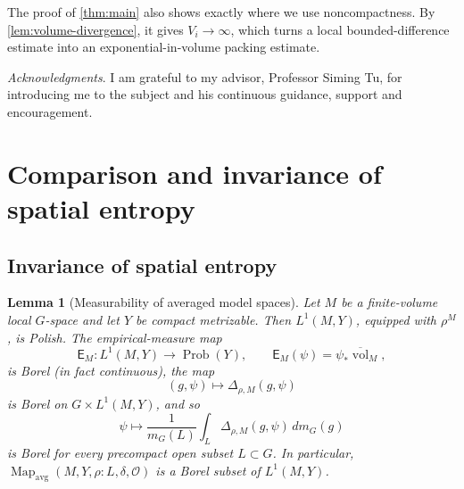 \documentclass[12pt]{amsart}
\newtheorem{lemma}[lemma]{Lemma}
\theoremstyle{definition}
\newcommand{\Haar}{m_G}
\newcommand{\vol}{\operatorname{vol}}
\newcommand{\Prob}{\operatorname{Prob}}
\newcommand{\Mapavg}{\operatorname{Map}_{\mathrm{avg}}}
\newcommand{\cO}{\mathcal O}
\newcommand{\1}{\mathbf 1}
\begin{document}
The proof of \cref{thm:main} also shows exactly where we use noncompactness. By \cref{lem:volume-divergence}, it gives $V_i\to\infty$, which turns a local bounded-difference estimate into an exponential-in-volume packing estimate.

\medskip

\textit{Acknowledgments}.
I am grateful to my advisor, Professor Siming Tu, for introducing me to the subject and his continuous guidance, support and encouragement.



\appendix
\section{Comparison and invariance of spatial entropy }\label{app:singh-comparison}


\subsection{Invariance of spatial entropy}


\begin{lemma}[Measurability of averaged model spaces]\label{lem:mapavg-borel}
	Let $M$ be a finite-volume local $G$-space and let $Y$ be compact metrizable.
	Then $L^1(M,Y)$, equipped with $\rho^M$, is Polish. The empirical-measure
	map
	\[
	\mathsf E_M:L^1(M,Y)\longrightarrow\Prob(Y),
	\qquad \mathsf E_M(\psi)=\psi_*\overline{\vol}_M,
	\]
	is Borel (in fact continuous), the map
	\[
	(g,\psi)\longmapsto\Delta_{\rho,M}(g,\psi)
	\]
	is Borel on $G\times L^1(M,Y)$, and so
	\[
	\psi\longmapsto
	\frac1{\Haar(L)}\int_L\Delta_{\rho,M}(g,\psi)\,d\Haar(g)
	\]
	is Borel for every precompact open subset $L\subset G$. In particular,
	$\Mapavg(M,Y,\rho:L,\delta,\cO)$ is a Borel subset of $L^1(M,Y)$.
\end{lemma}
\end{document}

